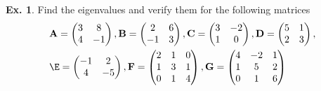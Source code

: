 \documentclass[11pt,a4paper]{book}
\theoremstyle{definition}\newtheorem{definition}{Definition}
\theoremstyle{definition}\newtheorem{fact}{Fact}
\theoremstyle{definition}\newtheorem{remark}{Remark}
\theoremstyle{definition}\newtheorem{ex}{Ex.}
\theoremstyle{definition}\newtheorem{project}{Project}
\theoremstyle{definition}\newtheorem{problem}{Problem}
\theoremstyle{definition}\newtheorem{example}{Example}
\numberwithin{theorem}{section}
\numberwithin{corollary}{chapter}
\numberwithin{assumption}{chapter}
\numberwithin{definition}{chapter}
\numberwithin{prop}{chapter}
\numberwithin{notation}{chapter}
\numberwithin{problem}{chapter}
\numberwithin{example}{chapter}
\numberwithin{fact}{chapter}
\numberwithin{ex}{chapter}
\def\A{\mathbf A}
\def\B{\mathbf B}
\def\C{\mathbf C}
\def\D{\mathbf D}
\def\F{\mathbf F}
\def\G{\mathbf G}
\begin{document}
	
	\begin{ex}
		Find the eigenvalues and verify them for the following matrices
		\begin{align*}
			& \A = \begin{pmatrix}
				3 & 8 \\ 4 & - 1
			\end{pmatrix},  
			 \B = \begin{pmatrix}
				2 & 6 \\ - 1 & 3
			\end{pmatrix}, 
			 \C =\begin{pmatrix}
				3 & -2 \\
				1 &  0  
			\end{pmatrix}, 
			 \D = \begin{pmatrix}
				5 & 1 \\
				2 & 3  
			\end{pmatrix}, \\
			&  \E = \begin{pmatrix}
				-1 & 2 \\
				4  & -5  
			\end{pmatrix}, 
			\F = \begin{pmatrix}
				2 & 1 & 0 \\
				1 & 3 & 1 \\
				0 & 1 & 4
			\end{pmatrix}, 
			 \G = \begin{pmatrix}
				4 & -2 & 1 \\
				1 &  5 & 2 \\
				0 &  1 & 6
			\end{pmatrix}
		\end{align*}
	\end{ex}
	
	
\end{document}
